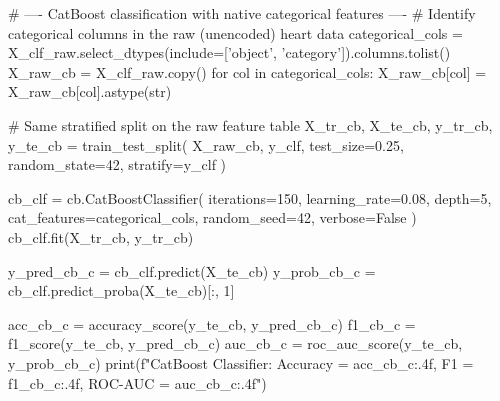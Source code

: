 \begin{codebox}[title={CatBoost classification with native categorical features}]
# ---- CatBoost classification with native categorical features ----
# Identify categorical columns in the raw (unencoded) heart data
categorical_cols = X_clf_raw.select_dtypes(include=['object', 'category']).columns.tolist()
X_raw_cb = X_clf_raw.copy()
for col in categorical_cols:
    X_raw_cb[col] = X_raw_cb[col].astype(str)

# Same stratified split on the raw feature table
X_tr_cb, X_te_cb, y_tr_cb, y_te_cb = train_test_split(
    X_raw_cb, y_clf, test_size=0.25, random_state=42, stratify=y_clf
)

cb_clf = cb.CatBoostClassifier(
    iterations=150, learning_rate=0.08, depth=5,
    cat_features=categorical_cols, random_seed=42, verbose=False
)
cb_clf.fit(X_tr_cb, y_tr_cb)

y_pred_cb_c = cb_clf.predict(X_te_cb)
y_prob_cb_c = cb_clf.predict_proba(X_te_cb)[:, 1]

acc_cb_c = accuracy_score(y_te_cb, y_pred_cb_c)
f1_cb_c = f1_score(y_te_cb, y_pred_cb_c)
auc_cb_c = roc_auc_score(y_te_cb, y_prob_cb_c)
print(f"CatBoost Classifier:  Accuracy = {acc_cb_c:.4f}, F1 = {f1_cb_c:.4f}, ROC-AUC = {auc_cb_c:.4f}")
\end{codebox}
